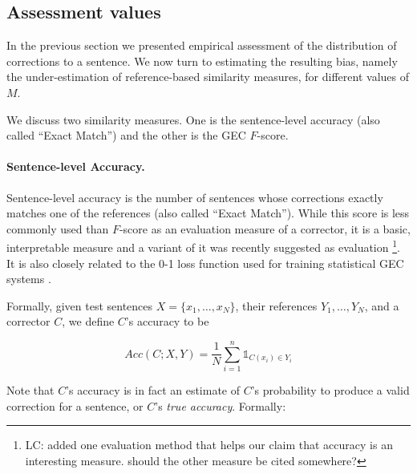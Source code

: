 \documentclass[letter,11pt]{article}
\newcommand{\lc}[1]{\footnote{\color{green}LC: #1}}
\begin{document}
		\subsection{Assessment values} \label{subsec:Assessment-values}
		
		In the previous section we presented empirical assessment of the distribution of
		corrections to a sentence. We now turn to estimating the resulting bias, namely
                the under-estimation of reference-based similarity measures, for different values of $M$.
		
		We discuss two similarity measures. One is the sentence-level accuracy
                (also called ``Exact Match'') and the other is the GEC $F$-score.
		
		\paragraph{Sentence-level Accuracy.}
		Sentence-level accuracy is the number of sentences whose corrections
                exactly matches one of the references (also called ``Exact Match'').
                While this score is less
                commonly used than $F$-score as an evaluation
		measure of a corrector, it is a basic, interpretable measure and a variant of it was recently suggested as evaluation \cite{felice2015towards}\lc{added one evaluation method that helps our claim that accuracy is an interesting measure.
                  should the other measure be cited somewhere?}. It is also closely related to the 0-1 loss function used
                for training statistical GEC systems \cite{chodorow2012problems,rozovskaya2013joint}. 
		
		Formally, given test sentences $X=\{x_1,\ldots,x_N\}$,
		their references $Y_1,\ldots,Y_N$, and a corrector $C$,
                we define $C$'s accuracy to be

		\begin{equation*}
		Acc(C;X,Y) = \frac{1}{N} \sum_{i=1}^n \mathds{1}_{C(x_i) \in Y_i}
		\end{equation*}

                Note that $C$'s accuracy is in fact an estimate of $C$'s probability to produce
                a valid correction for a sentence, or $C$'s {\it true accuracy}. Formally:
\end{document}
